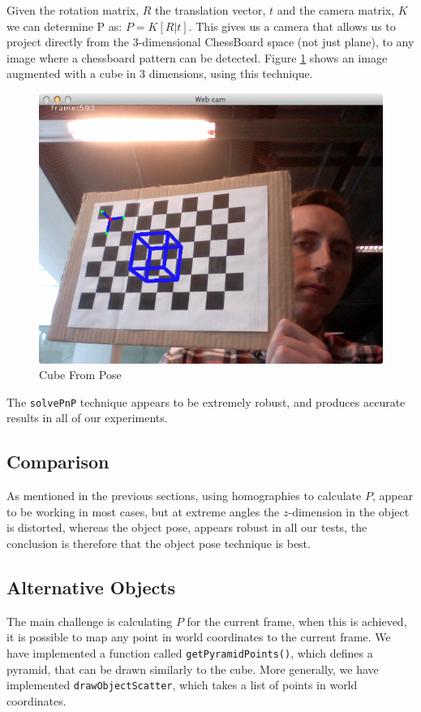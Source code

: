 \documentclass[a4paper,11pt]{article}
\begin{document}
Given the rotation matrix, $R$ the translation vector, $t$ and the camera matrix, $K$ we can determine P as: $P=K[R|t]$. This gives us a camera that allows us to project directly from the 3-dimensional ChessBoard space (not just plane), to any image where a chessboard pattern can be detected. Figure \ref{fig:cube_from_pose} shows an image augmented with a cube in 3 dimensions, using this technique.
\begin{figure}[H]
\centering
\includegraphics[width=0.8\linewidth]{pose_cube}
\caption{Cube From Pose}
\label{fig:cube_from_pose}
\end{figure}

The \texttt{solvePnP} technique appears to be extremely robust, and produces accurate results in all of our experiments.

\subsection{Comparison}
As mentioned in the previous sections, using homographies to calculate $P$, appear to be working in most cases, but at extreme angles the $z$-dimension in the object is distorted, whereas the object pose, appears robust in all our tests, the conclusion is therefore that the object pose technique is best.

\subsection{Alternative Objects}
The main challenge is calculating $P$ for the current frame, when this is achieved, it is possible to map any point in world coordinates to the current frame. We have implemented a function called \texttt{getPyramidPoints()}, which defines a pyramid, that can be drawn similarly to the cube. More generally, we have implemented \texttt{drawObjectScatter}, which takes a list of points in world coordinates.
\end{document}
